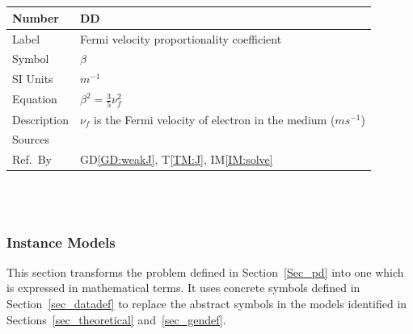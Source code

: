 \documentclass[12pt]{article}
\newcommand{\colAwidth}{0.13\textwidth}
\newcommand{\colBwidth}{0.82\textwidth}
\newcounter{defnum} %
\newcounter{datadefnum} %
\begin{document}
~\newline


~\newline

\noindent
\begin{minipage}{\textwidth}
	\renewcommand*{\arraystretch}{1.5}
	\begin{tabular}{| p{\colAwidth} | p{\colBwidth}|}
		\hline
		\rowcolor[gray]{0.9}
		Number& DD{datadefnum}\thedatadefnum \label{DD:beta}\\
		\hline
		Label& Fermi velocity proportionality coefficient \\
		\hline
		Symbol &$\beta$\\
		\hline
		SI Units & $m^{-1}$\\
		\hline
		Equation&$\beta^2 = \frac{3}{5} \nu_f^2$\\
		\hline
		Description & $\nu_f$ is the Fermi velocity of electron in the medium ($ms^{-1}$) 
		\\
		\hline
		Sources& \cite{hiremath2012numerical} \\
		\hline
		Ref.\ By & GD\ref{GD:weakJ}, T\ref{TM:J}, IM\ref{IM:solve} \\
		\hline
	\end{tabular}
\end{minipage}\\

~\newline




\subsubsection{Instance Models} \label{sec_instance}    

This section transforms the problem defined in Section~\ref{Sec_pd} into 
one which is expressed in mathematical terms. It uses concrete symbols defined 
in Section~\ref{sec_datadef} to replace the abstract symbols in the models 
identified in Sections~\ref{sec_theoretical} and~\ref{sec_gendef}.




\end{document}
